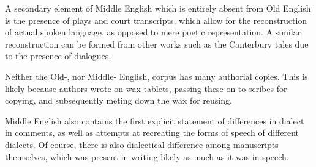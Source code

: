 \documentclass[12pt]{report}
\begin{document}
A secondary element of Middle English which is entirely absent from Old English 
is the presence of plays and court transcripts, which allow for the
reconstruction of actual spoken language, as opposed to mere poetic
representation. A similar reconstruction can be formed from other works such as
the Canterbury tales due to the presence of dialogues.

Neither the Old-, nor Middle- English, corpus has many authorial copies. This is
likely because authors wrote on wax tablets, passing these on to scribes for
copying, and subsequently meting down the wax for reusing.

Middle English also contains the first explicit statement of differences in
dialect in comments, as well as attempts at recreating the forms of speech of
different dialects. Of course, there is also dialectical difference among
manuscripts themselves, which was present in writing likely as much as it was in
speech.
\end{document}
